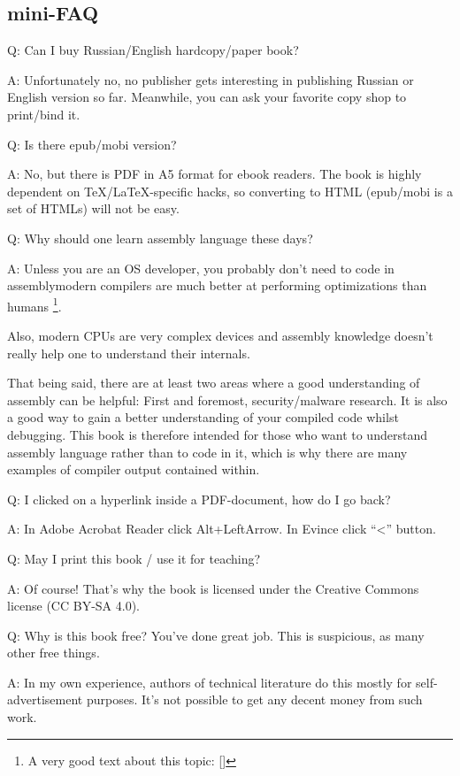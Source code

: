 \subsection*{mini-FAQ}

\par Q: Can I buy Russian/English hardcopy/paper book?
\par A: Unfortunately no, no publisher gets interesting in publishing Russian or English version so far.
Meanwhile, you can ask your favorite copy shop to print/bind it.

\par Q: Is there epub/mobi version?
\par A: No, but there is PDF in A5 format for ebook readers.
The book is highly dependent on TeX/LaTeX-specific hacks, so converting to HTML (epub/mobi is a set of HTMLs)
will not be easy.

\par Q: Why should one learn assembly language these days?
\par A: Unless you are an \ac{OS} developer, you probably don't need to code in assembly\textemdash{}modern compilers 
are much better at performing optimizations than humans \footnote{A very good text about this topic: [\AgnerFog]}.

Also, modern \ac{CPU}s are very complex devices and assembly knowledge doesn't really help one to understand their internals.

That being said, there are at least two areas where a good understanding of assembly can be helpful: 
First and foremost, security/malware research. It is also a good way to gain a better understanding of your compiled code whilst debugging.
This book is therefore intended for those who want to understand assembly language rather 
than to code in it, which is why there are many examples of compiler output contained within.

\par Q: I clicked on a hyperlink inside a PDF-document, how do I go back?
\par A: In Adobe Acrobat Reader click Alt+LeftArrow. In Evince click ``<'' button.

\par Q: May I print this book / use it for teaching?
\par A: Of course! That's why the book is licensed under the Creative Commons license (CC BY-SA 4.0).

\par Q: Why is this book free? You've done great job. This is suspicious, as many other free things.
\par A: In my own experience, authors of technical literature do this mostly for self-advertisement purposes. It's not possible to get any decent money from such work.

